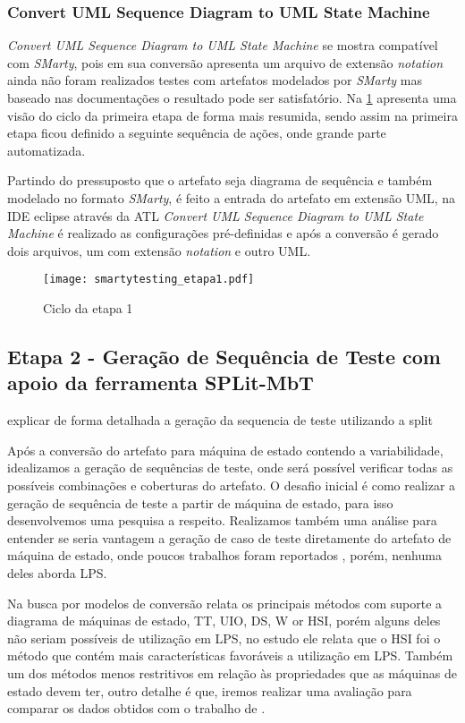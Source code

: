 \subsubsection{Convert UML Sequence Diagram to UML State Machine}
\textit{Convert UML Sequence Diagram to UML State Machine} se mostra compatível com \textit{SMarty}, pois em sua conversão apresenta um arquivo de extensão \textit{notation} ainda não foram realizados testes com artefatos modelados por \textit{SMarty} mas baseado nas documentações o resultado pode ser satisfatório. Na \ref{fig:SM_etapa1} apresenta uma visão do ciclo da primeira etapa de forma mais resumida, sendo assim na primeira etapa ficou definido a seguinte sequência de ações, onde grande parte automatizada. 

Partindo do pressuposto que o artefato seja diagrama de sequência e também modelado no formato \textit{SMarty}, é feito a entrada do artefato em extensão UML, na IDE eclipse através da ATL \textit{Convert UML Sequence Diagram to UML State Machine} é realizado as configurações pré-definidas e após a conversão é gerado dois arquivos, um com extensão \textit{notation} e outro UML.


\begin{figure}[htb]
	\centering
	\texttt{[image: smartytesting\_etapa1.pdf]}
	\caption{Ciclo da etapa 1}
	\label{fig:SM_etapa1}
\end{figure}


\subsection{Etapa 2 - Geração de Sequência de Teste com apoio da ferramenta SPLit-MbT}
\label{etapa2}

explicar de forma detalhada a geração da sequencia de teste utilizando a split


Após a conversão do artefato para máquina de estado contendo a variabilidade, idealizamos a geração de sequências de teste, onde será possível verificar todas as possíveis combinações e coberturas do artefato. O desafio inicial é como realizar a geração de sequência de teste a partir de máquina de estado, para isso desenvolvemos uma pesquisa a respeito. Realizamos também uma análise para entender se seria vantagem a geração de caso de teste diretamente do artefato de máquina de estado, onde poucos trabalhos foram reportados \cite{aggarwal2012test,dalepiane2014implementation,samuel2008automatic}, porém, nenhuma deles aborda LPS. 

Na busca por modelos de conversão \citealp{costa2016split} relata os principais métodos com suporte a diagrama de máquinas de estado,  TT, UIO, DS, W or HSI, porém alguns deles não seriam possíveis de utilização em LPS, no estudo ele relata que o HSI foi o método que contém mais características favoráveis a utilização em LPS. Também um dos métodos menos restritivos em relação às propriedades que as máquinas de estado devem ter, outro detalhe é que, iremos realizar uma avaliação para comparar os dados obtidos com o trabalho de \citealp{costa2016split}. 

